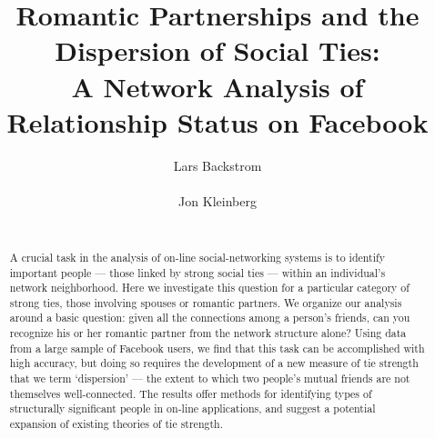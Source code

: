 \documentclass{sigchi}
\begin{document}
\title{Romantic Partnerships and the Dispersion of Social Ties: \\ A Network Analysis of Relationship Status on Facebook
}


 \author{
  \alignauthor Lars Backstrom\\
    \\
   \alignauthor Jon Kleinberg\\
     \\
 }


\maketitle

\begin{abstract}

A crucial task in the analysis of on-line social-networking systems
is to identify important people --- those linked by strong social ties ---
within an individual's network neighborhood.
Here we investigate this question for a particular category of
strong ties, those involving spouses or romantic partners.
We organize our analysis around a basic question:
given all the connections among a person's friends,
can you recognize his or her romantic partner from the network structure alone?
Using data from a large sample of Facebook users,
we find that this task can be accomplished with high accuracy,
but doing so requires the development of a new measure of tie strength
that we term `dispersion' --- the extent to which two people's mutual
friends are not themselves well-connected.
The results 
offer methods for identifying types
of structurally significant people in on-line applications, and
suggest a potential expansion of existing theories
of tie strength.

\end{abstract}
\end{document}
